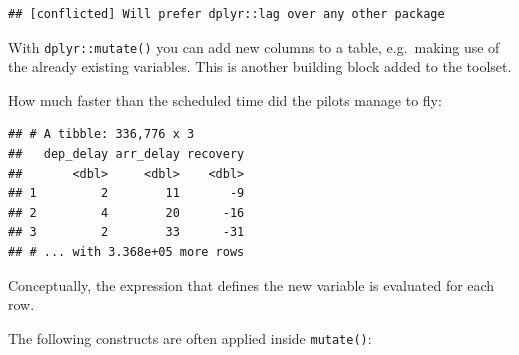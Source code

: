 \documentclass[]{book}
\newenvironment{Shaded}{}{}
\newcommand{\DataTypeTok}[1]{#1}
\newcommand{\KeywordTok}[1]{\textcolor[rgb]{0.00,0.00,1.00}{#1}}
\newcommand{\NormalTok}[1]{#1}
\newcommand{\OperatorTok}[1]{#1}
\newcommand{\StringTok}[1]{\textcolor[rgb]{0.00,0.50,0.50}{#1}}
\begin{document}
\begin{verbatim}
## [conflicted] Will prefer dplyr::lag over any other package
\end{verbatim}

With \texttt{dplyr::mutate()} you can add new columns to a table, e.g.~making use of the already existing variables.
This is another building block added to the toolset.

How much faster than the scheduled time did the pilots manage to fly:

\begin{Shaded}
\end{Shaded}

\begin{verbatim}
## # A tibble: 336,776 x 3
##   dep_delay arr_delay recovery
##       <dbl>     <dbl>    <dbl>
## 1         2        11       -9
## 2         4        20      -16
## 3         2        33      -31
## # ... with 3.368e+05 more rows
\end{verbatim}

Conceptually, the expression that defines the new variable is evaluated for each row.

The following constructs are often applied inside \texttt{mutate()}:
\end{document}
